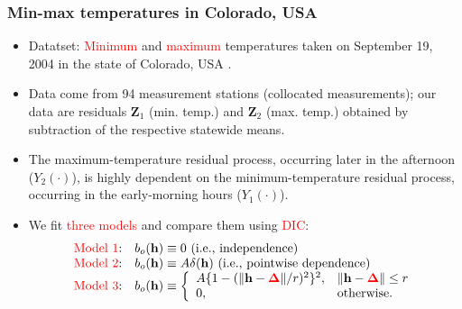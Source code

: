 \documentclass{beamer}
\newcommand{\Deltab} {\boldsymbol{\Delta}}
\newcommand{\h}{\mathbf{h}}
\begin{document}
\begin{frame}
\frametitle{Min-max temperatures in Colorado, USA}

\begin{itemize}
\item Datatset: \textcolor{red}{Minimum} and \textcolor{red}{maximum} temperatures taken on September 19, 2004 in the state of Colorado, USA \citep{GentonKleiber2015}.
\item Data come from 94 measurement stations (collocated measurements); our data are residuals $\mathbf{Z}_1$ (min. temp.) and $\mathbf{Z}_2$ (max. temp.) obtained by subtraction of the respective statewide means.
\item The maximum\hyp{}temperature residual process, occurring later in the afternoon ($Y_2(\cdot)$), is highly dependent on the minimum\hyp{}temperature residual process, occurring in the early-morning hours ($Y_1(\cdot)$).
\item We fit \textcolor{red}{three models} and compare them using \textcolor{red}{DIC}:
\begin{equation*}
\begin{array}{ll}
\textrm{\textcolor{red}{Model 1}:} &b_o(\h) \equiv 0 \mbox{ (i.e., independence)}\\
\textrm{\textcolor{red}{Model 2}:} &b_o(\h) \equiv A\delta(\h) \mbox{ (i.e., pointwise dependence)}\\
\textrm{\textcolor{red}{Model 3}:} &b_o(\h) \equiv \left\{\begin{array}{ll} A\{1 - (\|\h - \textcolor{red}{\Deltab}\|/r)^2\}^2, & \| \h - \textcolor{red}{\Deltab}\| \le r \\ 0, & \textrm{otherwise}. \end{array} \right.
\end{array}
\end{equation*}
\end{itemize}
\end{frame}

\end{document}
